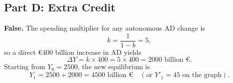 \documentclass{article}
\begin{document}
\subsection*{Part D: Extra Credit}

\textbf{False.}  The spending multiplier for any autonomous AD change is
\[
  k = \frac{1}{1-b} = 5,
\]
so a direct $\euro$400 billion increase in AD yields
\[
  \Delta Y = k \times 400 = 5 \times 400 = 2000\text{ billion $\euro$}.
\]
Starting from \(Y_0=2500\), the new equilibrium is
\[
  Y_1 = 2500 + 2000 = 4500\text{ billion $\euro$}
  \quad(\text{or }Y'_1 = 45\text{ on the graph}).
\]
\end{document}
